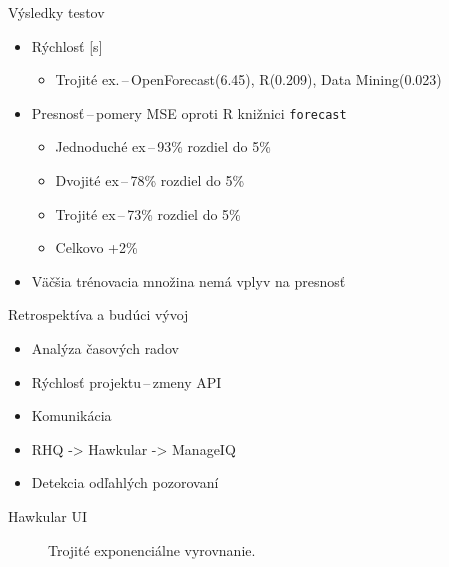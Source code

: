 \documentclass{beamer}
\begin{document}
\begin{frame}{Výsledky testov}
  \begin{itemize}
      \item Rýchlosť [s]
          \begin{itemize}
              \item Trojité ex.\,--\,OpenForecast(6.45), R(0.209), Data Mining(0.023)
          \end{itemize}
      \item Presnosť\,--\,pomery MSE oproti R knižnici \texttt{forecast}
          \begin{itemize}
              \item Jednoduché ex\,--\,93\% rozdiel do 5\%
              \item Dvojité ex\,--\,78\% rozdiel do 5\%
              \item Trojité ex\,--\,73\% rozdiel do 5\%
              \item Celkovo +2\%
          \end{itemize}
      \item Väčšia trénovacia množina nemá vplyv na presnosť
  \end{itemize}
\end{frame}

\begin{frame}{Retrospektíva a budúci vývoj}
  \begin{itemize}
      \item Analýza časových radov
      \item Rýchlosť projektu\,--\,zmeny API
      \item Komunikácia
      \item RHQ -> Hawkular -> ManageIQ
      \item Detekcia odľahlých pozorovaní
  \end{itemize}
\end{frame}

\begin{frame}{Hawkular UI}
  \begin{figure}[h]
    \begin{center}
        \caption{Trojité exponenciálne vyrovnanie.}
    \end{center}
  \end{figure}
\end{frame}
\end{document}
